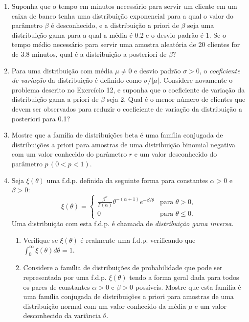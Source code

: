 \begin{enumerate}
    \item Suponha que o tempo em minutos necessário para servir um cliente em um caixa de banco tenha uma distribuição exponencial para a qual o valor do parâmetro $\beta$ é desconhecido, e a distribuição a priori de $\beta$ seja uma distribuição gama para a qual a média é 0.2 e o desvio padrão é 1. Se o tempo médio necessário para servir uma amostra aleatória de 20 clientes for de 3.8 minutos, qual é a distribuição a posteriori de $\beta$?
    
    \item Para uma distribuição com média $\mu \ne 0$ e desvio padrão $\sigma>0$, o \textit{coeficiente de variação} da distribuição é definido como $\sigma/|\mu|$. Considere novamente o problema descrito no Exercício 12, e suponha que o coeficiente de variação da distribuição gama a priori de $\beta$ seja 2. Qual é o menor número de clientes que devem ser observados para reduzir o coeficiente de variação da distribuição a posteriori para 0.1?
    
    \item Mostre que a família de distribuições beta é uma família conjugada de distribuições a priori para amostras de uma distribuição binomial negativa com um valor conhecido do parâmetro $r$ e um valor desconhecido do parâmetro $p \, (0<p<1)$.
    
    \item Seja $\xi(\theta)$ uma f.d.p. definida da seguinte forma para constantes $\alpha > 0$ e $\beta > 0$:
    $$ \xi(\theta) = 
    \begin{cases}
        \frac{\beta^\alpha}{\Gamma(\alpha)}\theta^{-(\alpha+1)}e^{-\beta/\theta} & \text{para } \theta>0, \\
        0 & \text{para } \theta \le 0.
    \end{cases}
    $$
    Uma distribuição com esta f.d.p. é chamada de \textit{distribuição gama inversa}.
    \begin{enumerate}[label=(\alph*)]
        \item Verifique se $\xi(\theta)$ é realmente uma f.d.p. verificando que $\int_0^\infty \xi(\theta)d\theta = 1$.
        \item Considere a família de distribuições de probabilidade que pode ser representada por uma f.d.p. $\xi(\theta)$ tendo a forma geral dada para todos os pares de constantes $\alpha>0$ e $\beta>0$ possíveis. Mostre que esta família é uma família conjugada de distribuições a priori para amostras de uma distribuição normal com um valor conhecido da média $\mu$ e um valor desconhecido da variância $\theta$.
    \end{enumerate}
    

\end{enumerate}

